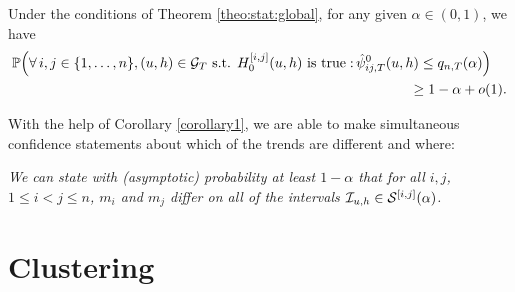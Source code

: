 \documentclass[a4paper,12pt]{article}
\begin{document}
\begin{corollary}\label{corollary1}
Under the conditions of Theorem \ref{theo:stat:global}, for any given $\alpha \in (0,1)$, we have
\begin{align*}
\mathbb{P}\Big( \forall \, i, j \in \{1, \ldots, n\}, (u, h) \in \mathcal{G}_T \text{ s.t. } H_0^{[i, j]}(u, h) \text{ is true}: & \, \hat{\psi}^0_{ij, T}(u, h) \le q_{n,T}(\alpha) \Big) \\ & \qquad \quad \quad \ge 1 - \alpha + o(1).
\end{align*}
\end{corollary} 


With the help of Corollary \ref{corollary1}, we are able to make simultaneous confidence statements about which of the trends are different and where:

\begin{center}
\begin{minipage}[c][1.25cm][c]{13cm}
\textit{We can state with (asymptotic) probability at least $1-\alpha$ that for all $i, j$, $1 \le i < j \le n$, $m_i$ and $m_j$ differ on all of the intervals $\mathcal{I}_{u, h} \in \mathcal{S}^{[i, j]}(\alpha)$.}
\end{minipage}
\end{center}



\section{Clustering}\label{sec:clustering}
\end{document}
